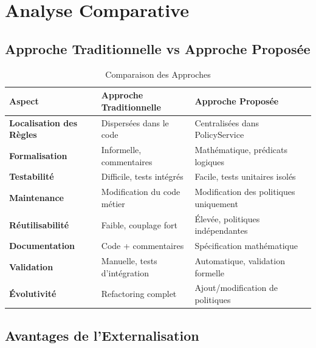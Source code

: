 \documentclass[12pt,a4paper]{article}
\begin{document}
    \newpage

    \section{Analyse Comparative}

    \subsection{Approche Traditionnelle vs Approche Proposée}

    \begin{table}[H]
        \centering
        \begin{tabular}{|p{3cm}|p{5cm}|p{5cm}|}
            \hline
            \textbf{Aspect} & \textbf{Approche Traditionnelle} & \textbf{Approche Proposée} \\
            \hline
            \textbf{Localisation des Règles} & Dispersées dans le code & Centralisées dans PolicyService \\
            \hline
            \textbf{Formalisation} & Informelle, commentaires & Mathématique, prédicats logiques \\
            \hline
            \textbf{Testabilité} & Difficile, tests intégrés & Facile, tests unitaires isolés \\
            \hline
            \textbf{Maintenance} & Modification du code métier & Modification des politiques uniquement \\
            \hline
            \textbf{Réutilisabilité} & Faible, couplage fort & Élevée, politiques indépendantes \\
            \hline
            \textbf{Documentation} & Code + commentaires & Spécification mathématique \\
            \hline
            \textbf{Validation} & Manuelle, tests d'intégration & Automatique, validation formelle \\
            \hline
            \textbf{Évolutivité} & Refactoring complet & Ajout/modification de politiques \\
            \hline
        \end{tabular}
        \caption{Comparaison des Approches}
    \end{table}

    \subsection{Avantages de l'Externalisation}
\end{document}
